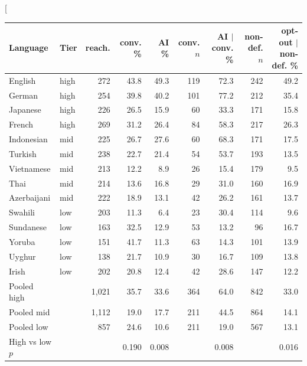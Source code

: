\documentclass[11pt]{article}
\begin{document}
\twocolumn[
\begin{minipage}{\textwidth}
\centering
\footnotesize
\setlength{\tabcolsep}{3.5pt}
\renewcommand{\arraystretch}{0.88}
\begin{tabular}{llrrrrrrr}
\toprule
Language & Tier & reach. & conv. \% & AI \% & conv. $n$ & AI $\mid$ conv. \% & non-def. $n$ & opt-out $\mid$ non-def. \% \\
\midrule
English & high & 272 & 43.8 & 49.3 & 119 & 72.3 & 242 & 49.2 \\
German & high & 254 & 39.8 & 40.2 & 101 & 77.2 & 212 & 35.4 \\
Japanese & high & 226 & 26.5 & 15.9 & 60 & 33.3 & 171 & 15.8 \\
French & high & 269 & 31.2 & 26.4 & 84 & 58.3 & 217 & 26.3 \\
Indonesian & mid & 225 & 26.7 & 27.6 & 60 & 68.3 & 171 & 17.5 \\
Turkish & mid & 238 & 22.7 & 21.4 & 54 & 53.7 & 193 & 13.5 \\
Vietnamese & mid & 213 & 12.2 & 8.9 & 26 & 15.4 & 179 & 9.5 \\
Thai & mid & 214 & 13.6 & 16.8 & 29 & 31.0 & 160 & 16.9 \\
Azerbaijani & mid & 222 & 18.9 & 13.1 & 42 & 26.2 & 161 & 13.7 \\
Swahili & low & 203 & 11.3 & 6.4 & 23 & 30.4 & 114 & 9.6 \\
Sundanese & low & 163 & 32.5 & 12.9 & 53 & 13.2 & 96 & 16.7 \\
Yoruba & low & 151 & 41.7 & 11.3 & 63 & 14.3 & 101 & 13.9 \\
Uyghur & low & 138 & 21.7 & 10.9 & 30 & 16.7 & 109 & 13.8 \\
Irish & low & 202 & 20.8 & 12.4 & 42 & 28.6 & 147 & 12.2 \\
\midrule
Pooled high & & 1,021 & 35.7 & 33.6 & 364 & 64.0 & 842 & 33.0 \\
Pooled mid & & 1,112 & 19.0 & 17.7 & 211 & 44.5 & 864 & 14.1 \\
Pooled low & & 857 & 24.6 & 10.6 & 211 & 19.0 & 567 & 13.1 \\
High vs low $p$ & & & 0.190 & 0.008 & & 0.008 & & 0.016 \\
\bottomrule
\end{tabular}
\label{tab:app-mech}
\end{minipage}
\end{document}

